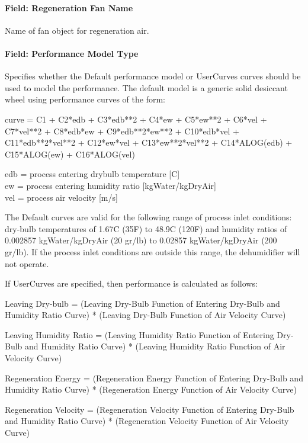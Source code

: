 \paragraph{Field: Regeneration Fan Name}\label{field-regeneration-fan-name}

Name of fan object for regeneration air.

\paragraph{Field: Performance Model Type}\label{field-performance-model-type}

Specifies whether the Default performance model or UserCurves curves should be used to model the performance. The default model is a generic solid desiccant wheel using performance curves of the form:

curve = C1 + C2*edb + C3*edb**2 + C4*ew + C5*ew**2 + C6*vel + C7*vel**2 + C8*edb*ew + C9*edb**2*ew**2 + C10*edb*vel + C11*edb**2*vel**2 + C12*ew*vel + C13*ew**2*vel**2 + C14*ALOG(edb) + C15*ALOG(ew) + C16*ALOG(vel)

edb = process entering drybulb temperature {[}C{]}\\
ew = process entering humidity ratio {[}kgWater/kgDryAir{]}\\
vel = process air velocity {[}m/s{]}

The Default curves are valid for the following range of process inlet conditions: dry-bulb temperatures of 1.67C (35F) to 48.9C (120F) and humidity ratios of 0.002857 kgWater/kgDryAir (20 gr/lb) to 0.02857 kgWater/kgDryAir (200 gr/lb). If the process inlet conditions are outside this range, the dehumidifier will not operate.

If UserCurves are specified, then performance is calculated as follows:

Leaving Dry-bulb = (Leaving Dry-Bulb Function of Entering Dry-Bulb and Humidity Ratio Curve) * (Leaving Dry-Bulb Function of Air Velocity Curve)

Leaving Humidity Ratio = (Leaving Humidity Ratio Function of Entering Dry-Bulb and Humidity Ratio Curve) * (Leaving Humidity Ratio Function of Air Velocity Curve)

Regeneration Energy = (Regeneration Energy Function of Entering Dry-Bulb and Humidity Ratio Curve) * (Regeneration Energy Function of Air Velocity Curve)

Regeneration Velocity = (Regeneration Velocity Function of Entering Dry-Bulb and Humidity Ratio Curve) * (Regeneration Velocity Function of Air Velocity Curve)

